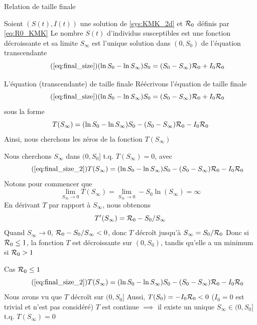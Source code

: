 \documentclass[aspectratio=169]{beamer}\usepackage[]{graphicx}\usepackage[]{xcolor}
\begin{document}
\begin{frame}{Relation de taille finale}
\begin{theorem}
  Soient $(S(t),I(t))$ une solution de \eqref{sys:KMK_2d} et $\mathcal{R}_0$ définis par \eqref{eq:R0_KMK}
  \vskip0.5cm
  Le nombre $S(t)$ d'individus susceptibles est une fonction décroissante et sa limite $S_\infty$ est l'unique solution dans $(0,S_0)$ de l'équation transcendante
  \begin{equation}\tag{\ref{eq:final_size}}
  (\ln S_0-\ln S_\infty)S_0 = (S_0-S_\infty)\R_0+I_0\R_0
  \end{equation}
\end{theorem}
\end{frame}



\begin{frame}{L'équation (transcendante) de taille finale}
  Réécrivons l'équation de taille finale
  \begin{equation}
    \tag{\ref{eq:final_size}}
  (\ln S_0-\ln S_\infty)S_0 = (S_0-S_\infty)\R_0+I_0\R_0
  \end{equation}
  sous la forme
  \begin{equation}
  \label{eq:final_size_2}
  T(S_\infty) =(\ln S_0-\ln S_\infty)S_0
  - (S_0-S_\infty)\mathcal{R}_0 -I_0\mathcal{R}_0
\end{equation}
\vfill
Ainsi, nous cherchons les zéros de la fonction $T(S_\infty)$
\end{frame}



\begin{frame}{}
  Nous cherchons $S_\infty$ dans $(0,S_0]$ t.q. $T(S_\infty)=0$, avec
  \begin{equation}\tag{\ref{eq:final_size_2}}
    T(S_\infty) =(\ln S_0-\ln S_\infty)S_0
    - (S_0-S_\infty)\R_0 -I_0\R_0      
  \end{equation}
  \vfill
  Notons pour commencer que 
  $$
  \lim_{S_\infty\to 0}T(S_\infty)=\lim_{S_\infty\to 0}-S_0\ln(S_\infty)=\infty
  $$
  \vfill
  En dérivant $T$ par rapport à $S_\infty$, nous obtenons 
  $$
  T'(S_\infty)=\mathcal{R}_0-S_0/S_\infty
  $$ 
  \vfill
  Quand $S_\infty\to 0$, $\mathcal{R}_0-S_0/S_\infty<0$, donc $T$ décroît jusqu'à $S_\infty=S_0/\mathcal{R}_0$
  \vfill
  Donc si $\mathcal{R}_0\leq 1$, la fonction $T$ est décroissante sur $(0,S_0)$, tandis qu'elle a un minimum si $\mathcal{R}_0>1$
\end{frame}



\begin{frame}{Cas $\mathcal{R}_0\leq 1$}
  \begin{equation}\tag{\ref{eq:final_size_2}}
    T(S_\infty) =(\ln S_0-\ln S_\infty)S_0
    - (S_0-S_\infty)\R_0 -I_0\R_0      
  \end{equation}
  \vfill
  \bbullet Nous avons vu que $T$ décroît sur $(0,S_0]$
  \vfill
  \bbullet Aussi, $T(S_0)=-I_0\mathcal{R}_0<0$ ($I_0=0$ est trivial et n'est pas considéré)
  \vfill
  \bbullet $T$ est continue
  \vfill
  $\implies$ il existe un unique $S_\infty\in (0,S_0]$ t.q. $T(S_\infty)=0$
\end{frame}
\end{document}

